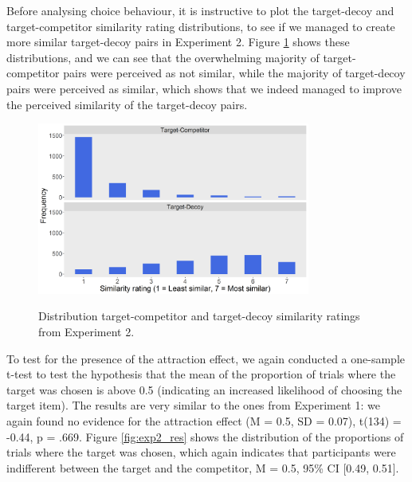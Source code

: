 \documentclass[11pt,a4paper]{article}
\begin{document}
Before analysing choice behaviour, it is instructive to plot the target-decoy and target-competitor similarity rating distributions, to see if we managed to create more similar target-decoy pairs in Experiment 2.  Figure \ref{fig:exp2_similarityratings} shows these distributions, and we can see that the overwhelming majority of target-competitor pairs were perceived as not similar, while the majority of target-decoy pairs were perceived as similar, which shows that we indeed managed to improve the perceived similarity of the target-decoy pairs.

\begin{figure}[htb!]
\centering
\captionsetup{justification=centering}
\caption{Distribution target-competitor and target-decoy similarity ratings from Experiment 2.}
\includegraphics[width=0.8\textwidth]{exp2_similarityratings.png}
\label{fig:exp2_similarityratings}
\end{figure}


To test for the presence of the attraction effect, we again conducted a one-sample t-test to test the hypothesis that the mean of the proportion of trials where the target was chosen  is above 0.5 (indicating an increased likelihood of choosing the target item). The results are very similar to the ones from Experiment 1: we again found no evidence for the attraction effect (M = 0.5, SD = 0.07), t(134) = -0.44, p = .669. Figure \ref{fig:exp2_res} shows the distribution of the proportions of trials where the target was chosen, which again indicates that participants were indifferent between the target and the competitor, M = 0.5, 95\% CI [0.49, 0.51].
\end{document}
